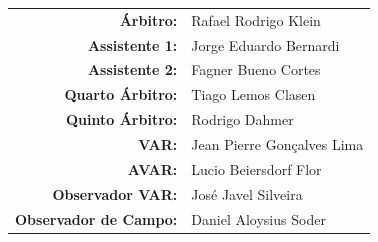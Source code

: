 \documentclass[11pt]{article}
\begin{document}
\vspace{0.5cm}
\begin{minipage}{0.65\textwidth}
\begin{center}
\begin{tabular}{rl}
\textbf{Árbitro:} & Rafael Rodrigo Klein \\
\textbf{Assistente 1:} & Jorge Eduardo Bernardi \\
\textbf{Assistente 2:} & Fagner Bueno Cortes \\
\textbf{Quarto Árbitro:} & Tiago Lemos Clasen \\
\textbf{Quinto Árbitro:} & Rodrigo Dahmer \\
\textbf{VAR:} & Jean Pierre Gonçalves Lima \\
\textbf{AVAR:} & Lucio Beiersdorf Flor \\
\textbf{Observador VAR:} & José Javel Silveira \\
\textbf{Observador de Campo:} & Daniel Aloysius Soder \\
\end{tabular}
\end{center}
\end{minipage}
\begin{minipage}{0.3\textwidth}
\end{minipage}
\newpage
\end{document}
